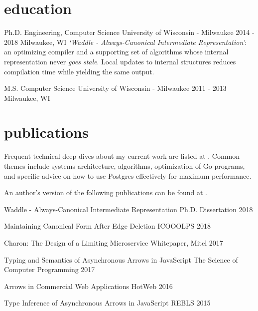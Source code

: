 \documentclass[]{clean-resume}
\begin{document}
\section{education}

\entry
  {Ph.D. Engineering, Computer Science}
  {University of Wisconsin - Milwaukee}
  {2014 - 2018}
  {Milwaukee, WI}
  {
    \emph{`Waddle - Always-Canonical Intermediate Representation'}: an optimizing compiler and a supporting set of algorithms whose internal representation never \emph{goes stale}. Local updates to internal structures reduces compilation time while yielding the same output.
  }

\entry
  {M.S. Computer Science}
  {University of Wisconsin - Milwaukee}
  {2011 - 2013}
  {Milwaukee, WI}
  {}

\section{publications}

Frequent technical deep-dives about my current work are listed at \articeslink. Common themes include systems architecture, algorithms, optimization of Go programs, and specific advice on how to use Postgres effectively for maximum performance.

An author's version of the following publications can be found at \paperslink.

\shortentry
  {Waddle - Always-Canonical Intermediate Representation}
  {Ph.D. Dissertation}
  {2018}

\shortentry
  {Maintaining Canonical Form After Edge Deletion}
  {ICOOOLPS}
  {2018}

\shortentry
  {Charon: The Design of a Limiting Microservice}
  {Whitepaper, Mitel}
  {2017}

\shortentry
  {Typing and Semantics of Asynchronous Arrows in JavaScript}
  {The Science of Computer Programming}
  {2017}

\shortentry
  {Arrows in Commercial Web Applications}
  {HotWeb}
  {2016}

\shortentry
  {Type Inference of Asynchronous Arrows in JavaScript}
  {REBLS}
  {2015}
\end{document}
